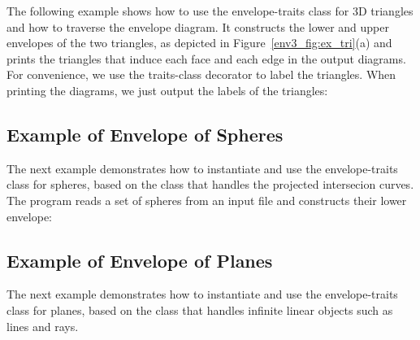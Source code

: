 The following example shows how to use the envelope-traits class
for 3D triangles and how to traverse the envelope diagram. It
constructs the lower and upper envelopes of the two triangles,
as depicted in Figure~\ref{env3_fig:ex_tri}(a) and prints the
triangles that induce each face and each edge in the output diagrams.
For convenience, we use the traits-class decorator
 to label the triangles. When
printing the diagrams, we just output the labels of the triangles:


\subsection{Example of Envelope of Spheres}

The next example demonstrates how to instantiate and use the
envelope-traits class for spheres, based on the
 class that handles the projected intersecion
curves. The program reads a set of spheres from an input file and
constructs their lower envelope:


\subsection{Example of Envelope of Planes}

The next example demonstrates how to instantiate and use the
envelope-traits class for planes, based on the
 class that handles infinite linear objects such as lines and rays.

